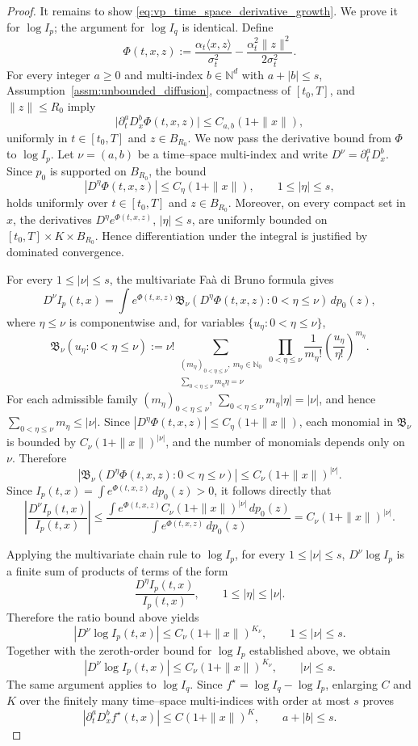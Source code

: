 \documentclass[11pt]{article}
\theoremstyle{plain}
\theoremstyle{definition}
\theoremstyle{remark}
\begin{document}
\begin{proof}
It remains to show \eqref{eq:vp_time_space_derivative_growth}. We prove it for \(\log I_p\);
the argument for \(\log I_q\) is identical. Define
\[
\Phi(t,x,z):=
\frac{\alpha_t\langle x,z\rangle}{\sigma_t^2}
-
\frac{\alpha_t^2\|z\|^2}{2\sigma_t^2}.
\]
For every integer \(a\ge0\) and multi-index \(b\in\mathbb N^d\) with
\(a+|b|\le s\), Assumption~\ref{assm:unbounded_diffusion}, compactness of
\([t_0,T]\), and \(\|z\|\le R_0\) imply
\[
\big|\partial_t^aD_x^b\Phi(t,x,z)\big|
\le C_{a,b}(1+\|x\|),
\]
uniformly in \(t\in[t_0,T]\) and \(z\in B_{R_0}\).
We now pass the derivative bound from \(\Phi\) to \(\log I_p\).
Let \(\nu=(a,b)\) be a time--space multi-index and write
\(D^\nu=\partial_t^aD_x^b\). Since \(p_0\) is supported on
\(B_{R_0}\), the bound
\[
|D^\eta\Phi(t,x,z)|\le C_\eta(1+\|x\|),
\qquad 1\le |\eta|\le s,
\]
holds uniformly over \(t\in[t_0,T]\) and \(z\in B_{R_0}\).
Moreover, on every compact set in \(x\), the derivatives
\(D^\eta e^{\Phi(t,x,z)}\), \(|\eta|\le s\), are uniformly bounded on
\([t_0,T]\times K\times B_{R_0}\). Hence differentiation under
the integral is justified by dominated convergence.

For every \(1\le |\nu|\le s\), the multivariate Faà di Bruno formula gives
\[
D^\nu I_p(t,x)
=
\int e^{\Phi(t,x,z)}
\mathfrak B_\nu\!\left(
D^\eta\Phi(t,x,z):0<\eta\le\nu
\right)
\,dp_0(z),
\]
where \(\eta\le\nu\) is componentwise and, for variables
\(\{u_\eta:0<\eta\le\nu\}\),
\[
\mathfrak B_\nu(u_\eta:0<\eta\le\nu)
:=
\nu!
\sum_{\substack{(m_\eta)_{0<\eta\le\nu},\ m_\eta\in\mathbb N_0\\
\sum_{0<\eta\le\nu}m_\eta\eta=\nu}}
\prod_{0<\eta\le\nu}
\frac{1}{m_\eta!}
\left(\frac{u_\eta}{\eta!}\right)^{m_\eta}.
\]
For each admissible family \((m_\eta)_{0<\eta\le\nu}\),
\(\sum_{0<\eta\le\nu}m_\eta|\eta|=|\nu|\), and hence
\(\sum_{0<\eta\le\nu}m_\eta\le |\nu|\). Since
\(|D^\eta\Phi(t,x,z)|\le C_\eta(1+\|x\|)\), each monomial in
\(\mathfrak B_\nu\) is bounded by \(C_\nu(1+\|x\|)^{|\nu|}\), and the
number of monomials depends only on \(\nu\). Therefore
\[
\left|
\mathfrak B_\nu\!\left(
D^\eta\Phi(t,x,z):0<\eta\le\nu
\right)
\right|
\le C_\nu(1+\|x\|)^{|\nu|}.
\]
Since \(I_p(t,x)=\int e^{\Phi(t,x,z)}\,dp_0(z)>0\), it follows directly that
\[
\left|
\frac{D^\nu I_p(t,x)}{I_p(t,x)}
\right|
\le
\frac{
\int e^{\Phi(t,x,z)} C_\nu(1+\|x\|)^{|\nu|}\,dp_0(z)
}{
\int e^{\Phi(t,x,z)}\,dp_0(z)
}
=
C_\nu(1+\|x\|)^{|\nu|}.
\]

Applying the multivariate chain rule to \(\log I_p\), for every
\(1\le |\nu|\le s\), \(D^\nu\log I_p\) is a finite sum of products of
terms of the form
\[
\frac{D^{\eta}I_p(t,x)}{I_p(t,x)},
\qquad 1\le |\eta|\le |\nu|.
\]
Therefore the ratio bound above yields
\[
|D^\nu\log I_p(t,x)|
\le C_\nu(1+\|x\|)^{K_\nu},
\qquad 1\le |\nu|\le s.
\]
Together with the zeroth-order bound for \(\log I_p\) established above,
we obtain
\[
|D^\nu\log I_p(t,x)|
\le C_\nu(1+\|x\|)^{K_\nu},
\qquad |\nu|\le s.
\]
The same argument applies to \(\log I_q\). Since
\(f^\star=\log I_q-\log I_p\), enlarging \(C\) and \(K\) over the
finitely many time--space multi-indices with order at most \(s\) proves
\[
\left|\partial_t^aD_x^b f^\star(t,x)\right|
\le C(1+\|x\|)^K,
\qquad a+|b|\le s.
\]


\end{proof}
\end{document}
